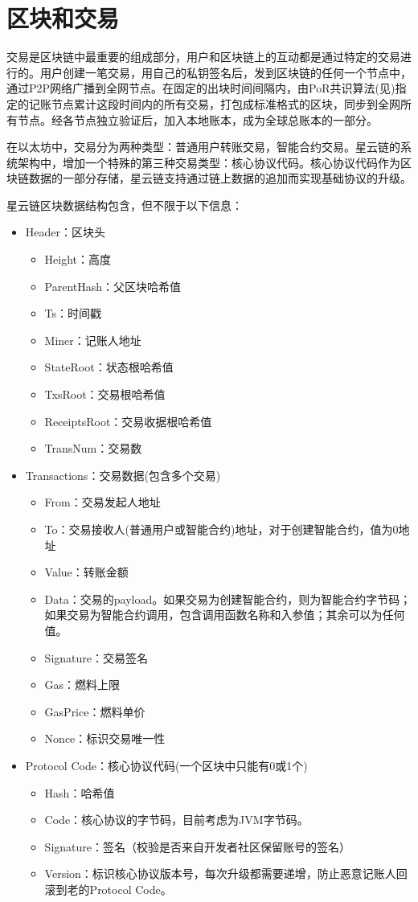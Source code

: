 \section{区块和交易}
\label{sec:block}
交易是区块链中最重要的组成部分，用户和区块链上的互动都是通过特定的交易进行的。用户创建一笔交易，用自己的私钥签名后，发到区块链的任何一个节点中，通过P2P网络广播到全网节点。在固定的出块时间间隔内，由PoR共识算法(见)指定的记账节点累计这段时间内的所有交易，打包成标准格式的区块，同步到全网所有节点。经各节点独立验证后，加入本地账本，成为全球总账本的一部分。

在以太坊中，交易分为两种类型：普通用户转账交易，智能合约交易。星云链的系统架构中，增加一个特殊的第三种交易类型：核心协议代码。核心协议代码作为区块链数据的一部分存储，星云链支持通过链上数据的追加而实现基础协议的升级。

星云链区块数据结构包含，但不限于以下信息：
\begin{itemize}
	\item Header：区块头
		\begin{itemize}
		\item Height：高度
		\item ParentHash：父区块哈希值
		\item Ts：时间戳
		\item Miner：记账人地址
		\item StateRoot：状态根哈希值
		\item TxsRoot：交易根哈希值
		\item ReceiptsRoot：交易收据根哈希值
		\item TransNum：交易数
		\end{itemize}
	\item Transactions：交易数据(包含多个交易)
		\begin{itemize}
		\item From：交易发起人地址
		\item To：交易接收人(普通用户或智能合约)地址，对于创建智能合约，值为0地址
		\item Value：转账金额
		\item Data：交易的payload。如果交易为创建智能合约，则为智能合约字节码；如果交易为智能合约调用，包含调用函数名称和入参值；其余可以为任何值。
		\item Signature：交易签名
		\item Gas：燃料上限
		\item GasPrice：燃料单价
		\item Nonce：标识交易唯一性
		\end{itemize}
	\item Protocol Code：核心协议代码(一个区块中只能有0或1个)
		\begin{itemize}
		\item Hash：哈希值
		\item Code：核心协议的字节码，目前考虑为JVM字节码。
		\item Signature：签名（校验是否来自开发者社区保留账号的签名）
		\item Version：标识核心协议版本号，每次升级都需要递增，防止恶意记账人回滚到老的Protocol Code。
		\end{itemize}
\end{itemize}

